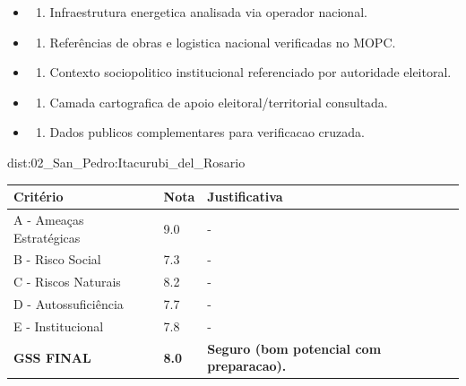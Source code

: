 {\begin{itemize}
\item
  \begin{enumerate}
  \def\labelenumi{\arabic{enumi})}
  \setcounter{enumi}{7}
  \tightlist
  \item
    Infraestrutura energetica analisada via operador nacional.
  \end{enumerate}
\item
  \begin{enumerate}
  \def\labelenumi{\arabic{enumi})}
  \setcounter{enumi}{8}
  \tightlist
  \item
    Referências de obras e logistica nacional verificadas no MOPC.
  \end{enumerate}
\item
  \begin{enumerate}
  \def\labelenumi{\arabic{enumi})}
  \setcounter{enumi}{9}
  \tightlist
  \item
    Contexto sociopolitico institucional referenciado por autoridade
    eleitoral.
  \end{enumerate}
\item
  \begin{enumerate}
  \def\labelenumi{\arabic{enumi})}
  \setcounter{enumi}{10}
  \tightlist
  \item
    Camada cartografica de apoio eleitoral/\allowbreak territorial consultada.
  \end{enumerate}
\item
  \begin{enumerate}
  \def\labelenumi{\arabic{enumi})}
  \setcounter{enumi}{11}
  \tightlist
  \item
    Dados publicos complementares para verificacao cruzada.
  \end{enumerate}
\end{itemize}}{dist:02_San_Pedro:Itacurubi_del_Rosario}
\begin{table}[ht!]
\small \begin{tabular}{p{3.0cm}p{0.8cm}p{6.0cm}} \toprule
\textbf{Critério} & \textbf{Nota} & \textbf{Justificativa} \\ \midrule
A - Ameaças Estratégicas & 9.0 & - \\
B - Risco Social & 7.3 & - \\
C - Riscos Naturais & 8.2 & - \\
D - Autossuficiência & 7.7 & - \\
E - Institucional & 7.8 & - \\
\midrule \textbf{GSS FINAL} & \textbf{8.0} & \textbf{Seguro (bom potencial com preparacao).} \\ \bottomrule \end{tabular}
\end{table}
